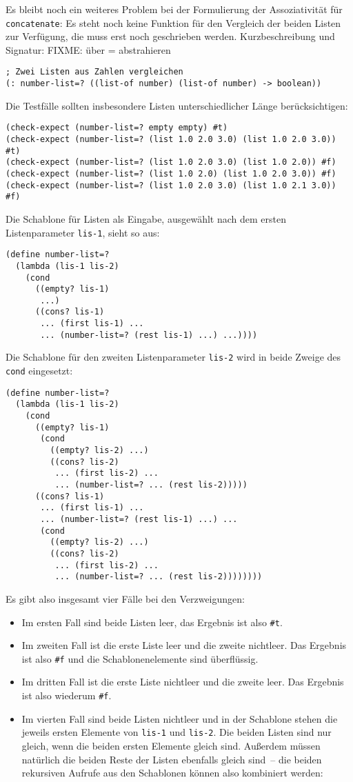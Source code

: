 Es bleibt noch ein weiteres Problem bei der Formulierung der
Assoziativität für \lstinline{concatenate}: Es steht noch keine Funktion
für den Vergleich der beiden Listen zur Verfügung, die muss erst noch
geschrieben werden.  Kurzbeschreibung und
Signatur:
%
FIXME: über = abstrahieren
%
\begin{lstlisting}
; Zwei Listen aus Zahlen vergleichen
(: number-list=? ((list-of number) (list-of number) -> boolean))
\end{lstlisting}
%
Die Testfälle sollten insbesondere Listen unterschiedlicher Länge
berücksichtigen:
%
\begin{lstlisting}
(check-expect (number-list=? empty empty) #t)
(check-expect (number-list=? (list 1.0 2.0 3.0) (list 1.0 2.0 3.0)) #t)
(check-expect (number-list=? (list 1.0 2.0 3.0) (list 1.0 2.0)) #f)
(check-expect (number-list=? (list 1.0 2.0) (list 1.0 2.0 3.0)) #f)
(check-expect (number-list=? (list 1.0 2.0 3.0) (list 1.0 2.1 3.0)) #f)
\end{lstlisting}
%
Die Schablone für Listen als Eingabe, ausgewählt nach dem ersten Listenparameter
\lstinline{lis-1}, sieht so aus:
% 
\begin{lstlisting}
(define number-list=?
  (lambda (lis-1 lis-2)
    (cond
      ((empty? lis-1)
       ...)
      ((cons? lis-1)
       ... (first lis-1) ...
       ... (number-list=? (rest lis-1) ...) ...))))
\end{lstlisting}
%
Die Schablone für den zweiten Listenparameter \lstinline{lis-2} wird in
beide Zweige des \lstinline{cond} eingesetzt:
%
\begin{lstlisting}
(define number-list=?
  (lambda (lis-1 lis-2)
    (cond
      ((empty? lis-1)
       (cond
         ((empty? lis-2) ...)
         ((cons? lis-2)
          ... (first lis-2) ...
          ... (number-list=? ... (rest lis-2)))))
      ((cons? lis-1)
       ... (first lis-1) ...
       ... (number-list=? (rest lis-1) ...) ...
       (cond
         ((empty? lis-2) ...)
         ((cons? lis-2)
          ... (first lis-2) ...
          ... (number-list=? ... (rest lis-2))))))))
\end{lstlisting}
%
Es gibt also insgesamt vier Fälle bei den Verzweigungen:
\begin{itemize}
\item Im ersten
Fall sind beide Listen leer, das Ergebnis ist also \lstinline{#t}.
\item Im zweiten Fall ist die erste Liste leer und die zweite
  nichtleer.  Das Ergebnis ist also \lstinline{#f} und die
  Schablonenelemente sind überflüssig.
\item Im dritten Fall ist die erste Liste nichtleer und die zweite
  leer.  Das Ergebnis ist also wiederum \lstinline{#f}.
\item Im vierten Fall sind beide Listen nichtleer und in der Schablone
  stehen die jeweils ersten Elemente von \lstinline{lis-1} und
  \lstinline{lis-2}.  Die beiden Listen sind nur gleich, wenn die beiden
  ersten Elemente gleich sind.  Außerdem müssen natürlich die beiden
  Reste der Listen ebenfalls gleich sind~-- die beiden rekursiven
  Aufrufe aus den Schablonen können also kombiniert werden:
\end{itemize}
